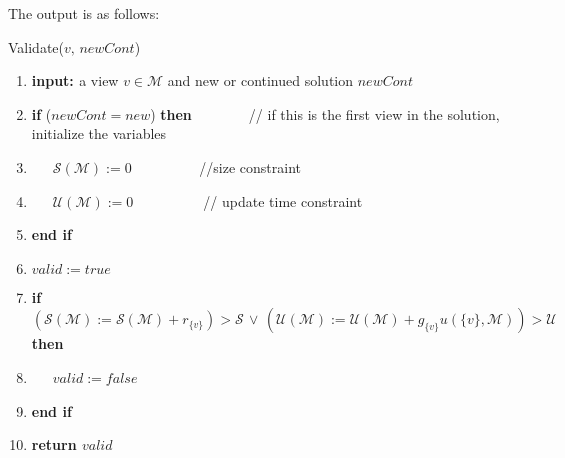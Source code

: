 The output is as follows:

\begin{algorithm}
\caption{\label{alg:Validate()-1}Validate($v,\, newCont$)}

\begin{enumerate}
\item \textbf{\footnotesize{input: }}{\footnotesize{a view $v\in\mathcal{M}$
and new or continued solution $newCont$}}{\footnotesize \par}
\item \textbf{\footnotesize{if}}{\footnotesize{ ($newCont=new$) }}\textbf{\footnotesize{then~}}{\footnotesize{~~~~~~~//
if this is the first view in the solution, initialize the variables}}{\footnotesize \par}
\item {\footnotesize{~~~$\mathcal{S}(\mathcal{M}):=0$ ~~~~~~~~~//size
constraint}}{\footnotesize \par}
\item {\footnotesize{~~~$\mathcal{U}(\mathcal{M}):=0$~~~~~~~~~~//
update time constraint}}{\footnotesize \par}
\item \textbf{\footnotesize{end if}}{\footnotesize \par}
\item {\footnotesize{$valid:=true$}}{\footnotesize \par}
\item \textbf{\footnotesize{if}}{\footnotesize{ $(\mathcal{S}(\mathcal{M}):=\mathcal{S}(\mathcal{M})+r_{\{v\}})>\mathcal{S}\,\vee\,(\mathcal{U}(\mathcal{M}):=\mathcal{U}(\mathcal{M})+g_{\{v\}}u(\{v\},\mathcal{M}))>\mathcal{U}$
}}\textbf{\footnotesize{then }}{\footnotesize \par}
\item {\footnotesize{~~~$valid:=false$}}{\footnotesize \par}
\item \textbf{\footnotesize{end if}}{\footnotesize{\vspace*{-5mm}}}{\footnotesize \par}
\item \textbf{\footnotesize{return $valid$}}\end{enumerate}
\end{algorithm}


